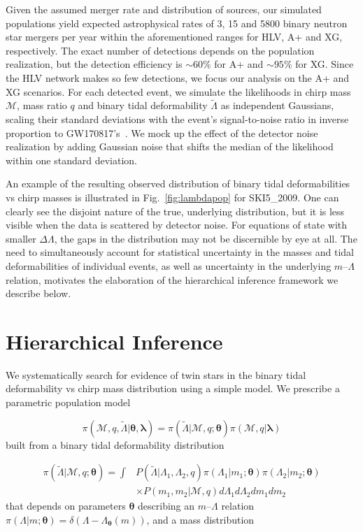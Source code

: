\documentclass[aps,prd,twocolumn,superscriptaddress,nofootinbib]{revtex4-1}
\begin{document}
Given the assumed merger rate and distribution of sources, our simulated populations yield expected astrophysical rates of 3, 15 and 5800 binary neutron star mergers per year within the aforementioned ranges for HLV, A+ and XG, respectively. The exact number of detections depends on the population realization, but the detection efficiency is $\sim 60\%$ for A+ and $\sim 95\%$ for XG. Since the HLV network makes so few detections, we focus our analysis on the A+ and XG scenarios. For each detected event, we simulate the likelihoods in chirp mass $\mathcal{M}$, mass ratio $q$ and binary tidal deformability $\tilde{\Lambda}$ as independent Gaussians, scaling their standard deviations with the event's signal-to-noise ratio in inverse proportion to GW170817's~\cite{FarrBerry2016}. We mock up the effect of the detector noise realization by adding Gaussian noise that shifts the median of the likelihood within one standard deviation.

An example of the resulting observed distribution of binary tidal deformabilities vs chirp masses is illustrated in Fig.~\ref{fig:lambdapop} for SKI5\_2009. One can clearly see the disjoint nature of the true, underlying distribution, but it is less visible when the data is scattered by detector noise. For equations of state with smaller $\Delta\Lambda$, the gaps in the distribution may not be discernible by eye at all. 
The need to simultaneously account for statistical uncertainty in the masses and tidal deformabilities of individual events, as well as uncertainty in the underlying $m$--$\Lambda$ relation, motivates the elaboration of the hierarchical inference framework we describe below.

\section{Hierarchical Inference}\label{Sec_inference}

We systematically search for evidence of twin stars in the binary tidal deformability vs chirp mass distribution using a simple model. We prescribe a parametric population model

\begin{equation}
    \pi(\mathcal{M},q,\tilde{\Lambda}|\boldsymbol{\theta},\boldsymbol{\lambda}) = \pi(\tilde{\Lambda}|\mathcal{M},q;\boldsymbol{\theta}) \pi(\mathcal{M},q|\boldsymbol{\lambda})
\end{equation}
built from a binary tidal deformability distribution

\begin{align} \label{lambdadist}
    \pi(\tilde{\Lambda}|\mathcal{M},q;\boldsymbol{\theta}) = \int& P(\tilde{\Lambda}|\Lambda_1,\Lambda_2,q) \pi(\Lambda_1|m_1;\boldsymbol{\theta}) \pi(\Lambda_2|m_2;\boldsymbol{\theta}) \nonumber \\ 
    &\times P(m_1,m_2|\mathcal{M},q) d\Lambda_1 d\Lambda_2 dm_1 dm_2 
\end{align}
that depends on parameters $\boldsymbol{\theta}$ describing an $m$--$\Lambda$ relation $\pi(\Lambda|m;\boldsymbol{\theta}) = \delta(\Lambda - \Lambda_{\boldsymbol{\theta}}(m))$, and a mass distribution
\end{document}

